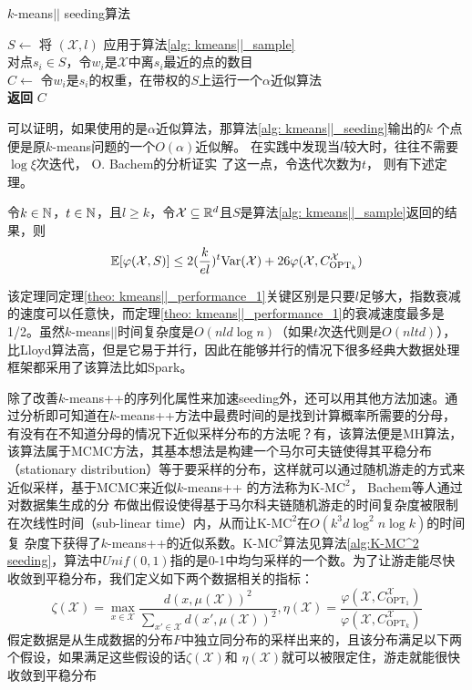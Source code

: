\begin{algorithm}
    \caption{$k$-means\(\vert \vert\) seeding算法}\label{alg: kmeans||_seeding}
    $S \gets$ 将 $(\mathcal{X},l)$ 应用于算法\ref{alg: kmeans||_sample} \\
    对点$s_i \in S$，令$w_i$是$\mathcal{X}$中离$s_i$最近的点的数目 \\
    $C \gets$ 令$w_i$是$s_i$的权重，在带权的$S$上运行一个$\alpha$近似算法 \\
    \textbf{返回} $C$
\end{algorithm}
可以证明，如果使用的是$\alpha$近似算法，那算法\ref{alg: kmeans||_seeding}输出的$k$
个点便是原$k$-means问题的一个$O(\alpha)$近似解。 在实践中发现当$l$较大时，往往不需要$\log \xi$次迭代， O. Bachem\cite{bachem2017distributed}的分析证实
了这一点，令迭代次数为$t$， 则有下述定理。
\begin{theorem}
    令$k \in \mathbb{N}$，$t \in \mathbb{N}$，且$l \geq k$，令$\mathcal{X} \subseteq \mathbb{R}^d$且$S$是算法\ref{alg: kmeans||_sample}返回的结果，则
    \begin{equation}
    \mathbb{E}[\varphi(\mathcal{X},S)] \leq 2(\frac{k}{el})^t \text{Var}(\mathcal{X}) + 26\varphi(\mathcal{X},C_{\text{OPT}_k}^{\mathcal{X}})
    \end{equation}
\end{theorem}
该定理同定理\ref{theo: kmeans||_performance_1}关键区别是只要$l$足够大，指数衰减的速度可以任意快，而定理\ref{theo: kmeans||_performance_1}的衰减速度最多是1/2。虽然$k$-means\(\vert \vert\)时间复杂度是$O(nld \log n)$（如果$t$次迭代则是$O(nltd)$），比Lloyd算法高，但是它易于并行，因此在能够并行的情况下很多经典大数据处理框架都采用了该算法比如Spark。

除了改善$k$-means++的序列化属性来加速seeding外，还可以用其他方法加速。通过分析即可知道在$k$-means++方法中最费时间的是找到计算概率所需要的分母，有没有在不知道分母的情况下近似采样分布的方法呢？有，该算法便是MH算法，该算法属于MCMC方法，其基本想法是构建一个马尔可夫链使得其平稳分布（stationary distribution）等于要采样的分布，这样就可以通过随机游走的方式来近似采样，基于MCMC来近似$k$-means++
的方法称为K-M$\text{C}^2$， Bachem等人通过对数据集生成的分
布做出假设使得基于马尔科夫链随机游走的时间复杂度被限制在次线性时间（sub-linear time）内，从而让K-M$\text{C}^2$在$O(k^3 d \log^2 n \log k)$的时间复
杂度下获得了$k$-means++的近似系数。K-M$\text{C}^2$算法见算法\ref{alg:K-MC^2 seeding}，算法中$Unif(0,1)$指的是0-1中均匀采样的一个数。为了让游走能尽快收敛到平稳分布，我们定义如下两个数据相关的指标：
\begin{equation}
\zeta(\mathcal{X}) = \max\limits_{x \in \mathcal{X}}\frac{d(x,\mu(\mathcal{X}))^2}{\sum_{x' \in \mathcal{X}}d(x',\mu(\mathcal{X}))^2}, \eta(\mathcal{X}) = \frac{\varphi(\mathcal{X},C_{\text{OPT}_1}^{\mathcal{X}})}{\varphi(\mathcal{X},C_{\text{OPT}_k}^{\mathcal{X}})}
\end{equation}
假定数据是从生成数据的分布$F$中独立同分布的采样出来的，且该分布满足以下两个假设，如果满足这些假设的话$\zeta(\mathcal{X})$和
$\eta(\mathcal{X})$就可以被限定住，游走就能很快收敛到平稳分布

